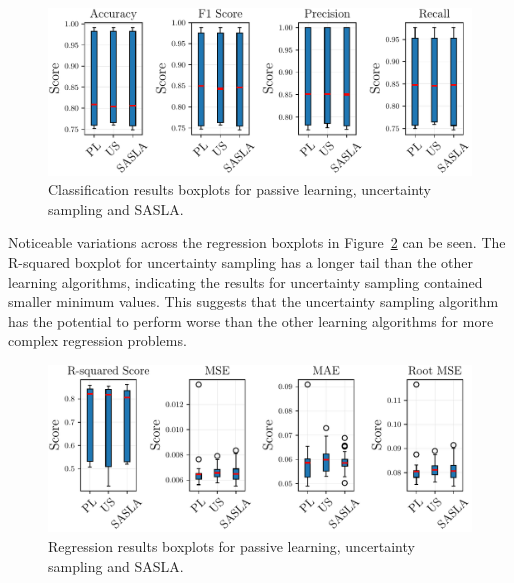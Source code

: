 \documentclass[conference]{IEEEtran}
\begin{document}
	\begin{figure}[htbp]
		\centering
		\includegraphics[width=\linewidth]{plots/classification_boxplots.pdf}
		\caption{Classification results boxplots for passive learning, uncertainty sampling and SASLA.}
		\label{fig:classification_boxplots}
	\end{figure}
	
	Noticeable variations across the regression boxplots in Figure~\ref{fig:regression_boxplots} can be seen. The R-squared boxplot for uncertainty sampling has a longer tail than the other learning algorithms, indicating the results for uncertainty sampling contained smaller minimum values. This suggests that the uncertainty sampling algorithm has the potential to perform worse than the other learning algorithms for more complex regression problems.  
	
	\begin{figure}[htbp]
		\centering
		\includegraphics[width=\linewidth]{plots/regression_boxplots.pdf}
		\caption{Regression results boxplots for passive learning, uncertainty sampling and SASLA.}
		\label{fig:regression_boxplots}
	\end{figure}
	
\end{document}

